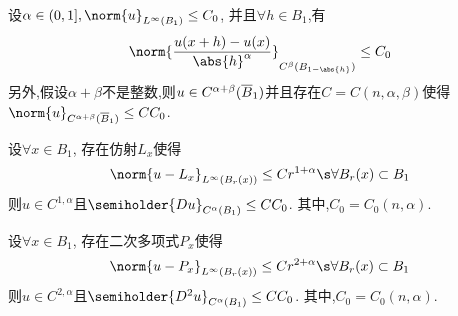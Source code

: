 \begin{proposition}
    设$\alpha \in (0,1], \norm{u}_{L^\infty(B_1)} \le C_0$, 并且$\forall h \in B_1$,有
    \begin{equation}
        \norm{\frac{u(x+h)-u(x)}{\abs{h}^\alpha}}_{C^\beta(B_{1-\abs{h}})} \le C_0
    \end{equation}
    另外,假设$\alpha+\beta$不是整数,则$u \in C^{\alpha+\beta}({\overline{B}_1})$并且存在$C=C(n,\alpha,\beta)$使得$\norm{u}_{C^{\alpha+\beta}(\BB)} \le CC_0$.
\end{proposition}
\begin{proposition}
    设$\forall x \in B_1$, 存在仿射$L_x$使得
    \begin{equation}
        \norm{u-L_x}_{L^\infty(B_r(x))} \le Cr^{1+\alpha} \s \forall B_r(x) \subset B_1
    \end{equation}
    则$u \in C^{1,\alpha}$且$\semiholder{Du}_{C^\alpha(B_1)} \le CC_0$.
    其中,$C_0=C_0(n,\alpha)$.
\end{proposition}
\begin{proposition}\label{holder_c2alpha}
    设$\forall x \in B_1$, 存在二次多项式$P_x$使得
    \begin{equation}
        \norm{u-P_x}_{L^\infty(B_r(x))} \le Cr^{2+\alpha} \s \forall B_r(x) \subset B_1
    \end{equation}
    则$u \in C^{2,\alpha}$且$\semiholder{D^2u}_{C^\alpha(B_1)} \le CC_0$.
    其中,$C_0=C_0(n,\alpha)$.
\end{proposition}
\newcommand{\bx}{{\bar{x}}}
\newcommand{\by}{{\bar{y}}}
\newcommand{\px}[1]{{P_{x,r}(#1)}}
\newcommand{\py}[1]{{P_{y,r}(#1)}}
